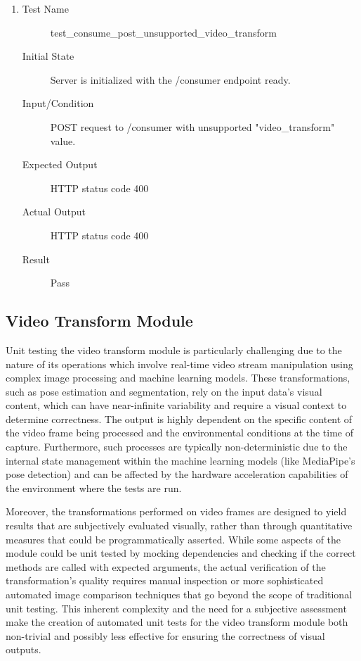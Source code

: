 \documentclass[12pt, titlepage]{article}
\begin{document}
\begin{enumerate}[UT-S1]
\item \label{UT-S12}
  \begin{description}
  \item[Test Name] test\_consume\_post\_unsupported\_video\_transform
  \item[Initial State] Server is initialized with the /consumer endpoint ready.
  \item[Input/Condition] POST request to /consumer with unsupported
    "video\_transform" value.
  \item[Expected Output] HTTP status code 400
  \item[Actual Output] HTTP status code 400
  \item[Result] Pass
  \end{description}
\end{enumerate}

\subsection{Video Transform Module}

Unit testing the video transform module is particularly challenging due to the
nature of its operations which involve real-time video stream manipulation using
complex image processing and machine learning models. These transformations,
such as pose estimation and segmentation, rely on the input data's visual
content, which can have near-infinite variability and require a visual context
to determine correctness. The output is highly dependent on the specific content
of the video frame being processed and the environmental conditions at the time
of capture. Furthermore, such processes are typically non-deterministic due to
the internal state management within the machine learning models (like
MediaPipe's pose detection) and can be affected by the hardware acceleration
capabilities of the environment where the tests are run.

Moreover, the transformations performed on video frames are designed to yield
results that are subjectively evaluated visually, rather than through
quantitative measures that could be programmatically asserted. While some
aspects of the module could be unit tested by mocking dependencies and checking
if the correct methods are called with expected arguments, the actual
verification of the transformation's quality requires manual inspection or more
sophisticated automated image comparison techniques that go beyond the scope of
traditional unit testing. This inherent complexity and the need for a subjective
assessment make the creation of automated unit tests for the video transform
module both non-trivial and possibly less effective for ensuring the correctness
of visual outputs.
\end{document}
